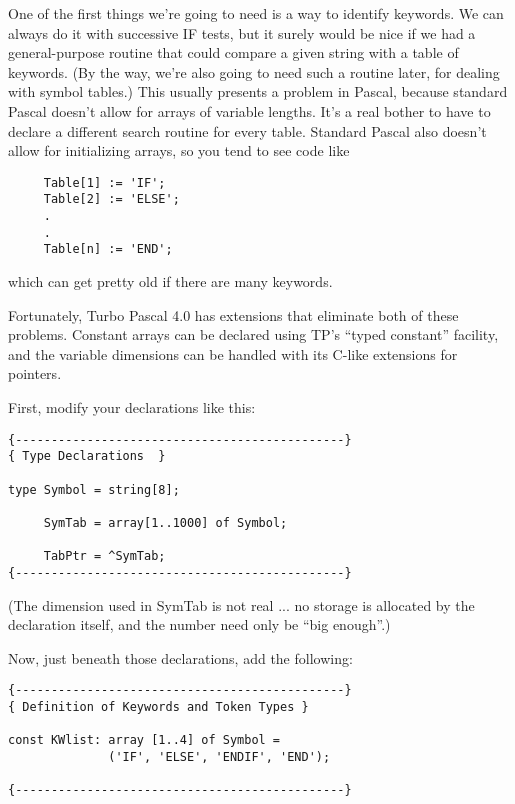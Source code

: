 One  of the first things we're going to need is a way to identify keywords. We can always do  it  with successive IF tests, but it surely would be nice  if  we  had  a general-purpose routine that could compare a given string with  a  table of keywords. (By the way, we're also going  to  need such a routine later, for dealing with symbol tables.)  This  usually presents a problem in Pascal, because standard Pascal  doesn't  allow  for  arrays  of variable lengths. It's  a  real  bother  to  have to declare a different search routine for every table. Standard  Pascal  also doesn't allow for initializing arrays, so you tend to see code like

\begin{verbatim}
     Table[1] := 'IF';
     Table[2] := 'ELSE';
     .
     .
     Table[n] := 'END';
\end{verbatim}

which can get pretty old if there are many keywords.

Fortunately, Turbo Pascal 4.0 has extensions that  eliminate both of  these  problems. Constant arrays can be declared using TP's ``typed constant'' facility, and  the  variable  dimensions  can be handled with its C-like extensions for pointers.

First, modify your declarations like this:

\begin{verbatim}
{----------------------------------------------}
{ Type Declarations  }

type Symbol = string[8];

     SymTab = array[1..1000] of Symbol;

     TabPtr = ^SymTab;
{----------------------------------------------}
\end{verbatim}

(The dimension  used  in  SymTab  is  not  real ... no storage is allocated by the declaration itself, and the number need only be ``big enough''.)

Now, just beneath those declarations, add the following:

\begin{verbatim}
{----------------------------------------------}
{ Definition of Keywords and Token Types }

const KWlist: array [1..4] of Symbol =
              ('IF', 'ELSE', 'ENDIF', 'END');

{----------------------------------------------}
\end{verbatim}

